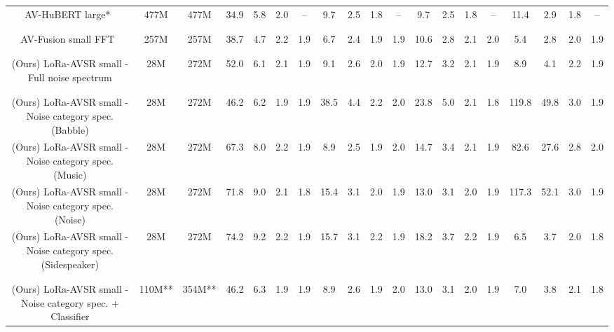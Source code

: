 \begin{table*}[ht]
{\begin{tabular}{c|cc|cccc|cccc|cccc|cccc}



AV-HuBERT large*~\cite{AVSR_robust_ssAVSR_avhubert2_2022} & 
477M & 477M & 34.9 & 5.8 & 2.0 & -- & 9.7 & 2.5 & 1.8 & -- & 9.7 & 2.5 & 1.8 & -- & 11.4 & 2.9 & 1.8 & -- \\
\\[-0.6em]
\hline
\\[-0.6em]
AV-Fusion small FFT~\cite{AVSR_2023_selfsupervised}& 
257M & 257M & 38.7 & 4.7 & 2.2 & 1.9 & 6.7 & 2.4 & 1.9 & 1.9 & 10.6 & 2.8 & 2.1 & 2.0 & 5.4 & 2.8 & 2.0 & 1.9 \\

\\[-0.6em]
\hline
\\[-0.6em]
(Ours) LoRa-AVSR small - Full noise spectrum & 
28M & 272M & 52.0 & 6.1 & 2.1 & 1.9 & 9.1 & 2.6 & 2.0 & 1.9 & 12.7 & 3.2 & 2.1 & 1.9 & 8.9 & 4.1 & 2.2 & 1.9\\

\\[-0.6em]
\hline
\\[-0.6em]

(Ours) LoRa-AVSR small - Noise category spec. (Babble) & 
28M & 272M & \cellcolor{gray!20}46.2 & \cellcolor{gray!20}6.2 & \cellcolor{gray!20}1.9 & \cellcolor{gray!20}1.9 & 38.5 & 4.4 & 2.2 & 2.0 & 23.8 & 5.0 & 2.1 & 1.8 & 119.8 & 49.8 & 3.0 & 1.9 \\

(Ours) LoRa-AVSR small - Noise category spec. (Music) & 
28M & 272M & 67.3 & 8.0 & 2.2 & 1.9 & \cellcolor{gray!20}8.9 & \cellcolor{gray!20}2.5 & \cellcolor{gray!20}1.9 & \cellcolor{gray!20}2.0 & 14.7 & 3.4 & 2.1 & 1.9 & 82.6 & 27.6 & 2.8 & 2.0 \\

(Ours) LoRa-AVSR small - Noise category spec. (Noise) & 
28M & 272M & 71.8 & 9.0 & 2.1 & 1.8 & 15.4 & 3.1 & 2.0 & 1.9 & \cellcolor{gray!20}13.0 & \cellcolor{gray!20}3.1 & \cellcolor{gray!20}2.0 & \cellcolor{gray!20}1.9 & 117.3 & 52.1 & 3.0 & 1.9 \\

(Ours) LoRa-AVSR small - Noise category spec. (Sidespeaker) & 
28M & 272M & 74.2 & 9.2 & 2.2 & 1.9 & 15.7 & 3.1 & 2.2 & 1.9 & 18.2 & 3.7 & 2.2 & 1.9 & \cellcolor{gray!20}6.5 & \cellcolor{gray!20}3.7 & \cellcolor{gray!20}2.0 & \cellcolor{gray!20}1.8\\
\\[-0.85em]
\hdashline
\\[-0.85em]
(Ours) LoRa-AVSR small - Noise category spec. + Classifier & 
110M** & 354M** & \cellcolor{green!15}46.2 & \cellcolor{green!15}6.3 & \cellcolor{green!15}1.9 & \cellcolor{green!15}1.9 & \cellcolor{green!15}8.9 & \cellcolor{green!15}2.6 & \cellcolor{green!15}1.9 & \cellcolor{green!15}2.0 & \cellcolor{green!15}13.0 & \cellcolor{green!15}3.1 & \cellcolor{green!15}2.0 & \cellcolor{green!15}1.9 & \cellcolor{green!15}7.0 & \cellcolor{green!15}3.8 & \cellcolor{green!15}2.1 & \cellcolor{green!15}1.8\\


\end{tabular}}
\end{table*}
